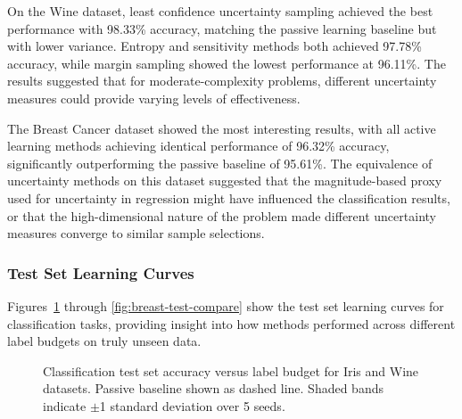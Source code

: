 \documentclass[conference]{IEEEtran}
\begin{document}
On the Wine dataset, least confidence uncertainty sampling achieved the best performance with 98.33\% accuracy, matching the passive learning baseline but with lower variance. Entropy and sensitivity methods both achieved 97.78\% accuracy, while margin sampling showed the lowest performance at 96.11\%. The results suggested that for moderate-complexity problems, different uncertainty measures could provide varying levels of effectiveness.

The Breast Cancer dataset showed the most interesting results, with all active learning methods achieving identical performance of 96.32\% accuracy, significantly outperforming the passive baseline of 95.61\%. The equivalence of uncertainty methods on this dataset suggested that the magnitude-based proxy used for uncertainty in regression might have influenced the classification results, or that the high-dimensional nature of the problem made different uncertainty measures converge to similar sample selections.

\subsubsection{Test Set Learning Curves}

Figures~\ref{fig:iris-test-compare} through \ref{fig:breast-test-compare} show the test set learning curves for classification tasks, providing insight into how methods performed across different label budgets on truly unseen data.

\begin{figure}[t]
\centering
{}
\hfill
{}
\caption{Classification test set accuracy versus label budget for Iris and Wine datasets. Passive baseline shown as dashed line. Shaded bands indicate $\pm$1 standard deviation over 5 seeds.}
\label{fig:iris-test-compare}
\end{figure}
\end{document}
